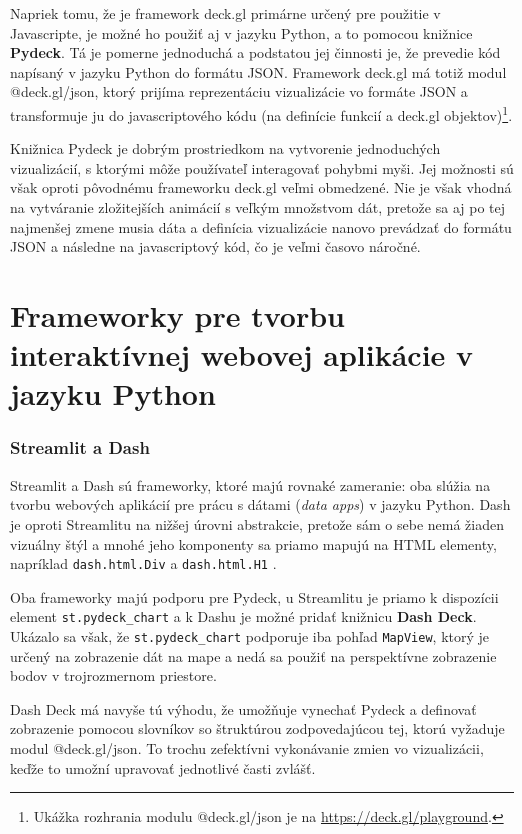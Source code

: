 Napriek tomu, že je framework deck.gl primárne určený pre použitie v Javascripte, je možné ho použiť aj v jazyku Python, a to pomocou knižnice \textbf{Pydeck}. Tá je pomerne jednoduchá a podstatou jej činnosti je, že prevedie kód napísaný v jazyku Python do formátu JSON. Framework deck.gl má totiž modul @deck.gl/json, ktorý prijíma reprezentáciu vizualizácie vo formáte JSON a transformuje ju do javascriptového kódu (na definície funkcií a deck.gl objektov)\footnote{Ukážka rozhrania modulu @deck.gl/json je na \url{https://deck.gl/playground}.}.

Knižnica Pydeck je dobrým prostriedkom na vytvorenie jednoduchých vizualizácií, s ktorými môže používateľ interagovať pohybmi myši. Jej možnosti sú však oproti pôvodnému frameworku deck.gl veľmi obmedzené. Nie je však vhodná na vytváranie zložitejších animácií s veľkým množstvom dát, pretože sa aj po tej najmenšej zmene musia dáta a definícia vizualizácie nanovo prevádzať do formátu JSON a následne na javascriptový kód, čo je veľmi časovo náročné.

\section{Frameworky pre tvorbu interaktívnej webovej aplikácie v jazyku Python}

\subsubsection{Streamlit a Dash}

Streamlit a Dash sú frameworky, ktoré majú rovnaké zameranie: oba slúžia na tvorbu webových aplikácií pre prácu s dátami (\emph{data apps}) v jazyku Python. Dash je oproti Streamlitu na nižšej úrovni abstrakcie, pretože sám o sebe nemá žiaden vizuálny štýl a mnohé jeho komponenty sa priamo mapujú na HTML elementy, napríklad \texttt{dash.html.Div} a \texttt{dash.html.H1} \cite{streamlit_documentation}\cite{dash_documentation}.

Oba frameworky majú podporu pre Pydeck, u Streamlitu je priamo k dispozícii element \texttt{st.pydeck\_chart} a k Dashu je možné pridať knižnicu \textbf{Dash Deck}. Ukázalo sa však, že \texttt{st.pydeck\_chart} podporuje iba pohľad \texttt{MapView}, ktorý je určený na zobrazenie dát na mape a nedá sa použiť na perspektívne zobrazenie bodov v trojrozmernom priestore.

Dash Deck má navyše tú výhodu, že umožňuje vynechať Pydeck a definovať zobrazenie pomocou slovníkov so štruktúrou zodpovedajúcou tej, ktorú vyžaduje modul @deck.gl/json. To trochu zefektívni vykonávanie zmien vo vizualizácii, keďže to umožní upravovať jednotlivé časti zvlášť.


